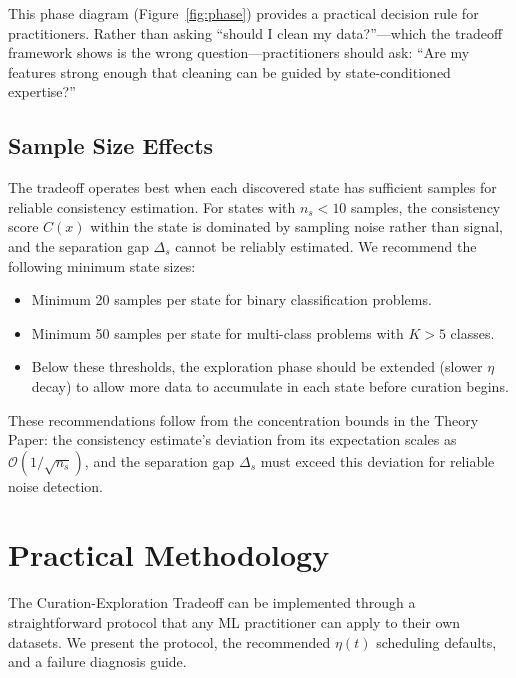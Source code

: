 \documentclass{article}
\begin{document}
This phase diagram (Figure~\ref{fig:phase}) provides a practical decision rule for practitioners. Rather than asking ``should I clean my data?''---which the tradeoff framework shows is the wrong question---practitioners should ask: ``Are my features strong enough that cleaning can be guided by state-conditioned expertise?''

\subsection{Sample Size Effects}
\label{sec:samplesize}

The tradeoff operates best when each discovered state has sufficient samples for reliable consistency estimation. For states with $n_s < 10$ samples, the consistency score $C(x)$ within the state is dominated by sampling noise rather than signal, and the separation gap $\Delta_s$ cannot be reliably estimated. We recommend the following minimum state sizes:

\begin{itemize}
    \item Minimum 20 samples per state for binary classification problems.
    \item Minimum 50 samples per state for multi-class problems with $K > 5$ classes.
    \item Below these thresholds, the exploration phase should be extended (slower $\eta$ decay) to allow more data to accumulate in each state before curation begins.
\end{itemize}

These recommendations follow from the concentration bounds in the Theory Paper: the consistency estimate's deviation from its expectation scales as $\mathcal{O}(1/\sqrt{n_s})$, and the separation gap $\Delta_s$ must exceed this deviation for reliable noise detection.

\section{Practical Methodology}
\label{sec:methodology}

The Curation-Exploration Tradeoff can be implemented through a straightforward protocol that any ML practitioner can apply to their own datasets. We present the protocol, the recommended $\eta(t)$ scheduling defaults, and a failure diagnosis guide.
\end{document}
